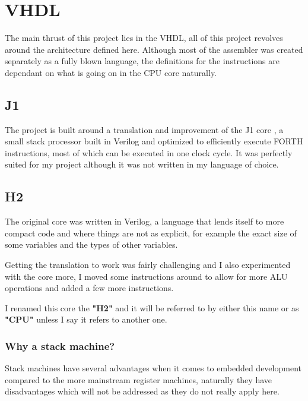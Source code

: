 \documentclass	[a4paper, 10pt]	{article}
\begin{document}
  
  \section{VHDL}

  The main thrust of this project lies in the VHDL, all of this project revolves around
  the architecture defined here. Although most of the assembler was created separately
  as a fully blown language, the definitions for the instructions are dependant on what 
  is going on in the CPU core naturally.

    \subsection{J1}
  
    The project is built around a translation and improvement of the J1 core \cite{j1core},
    a small stack processor built in Verilog and optimized to efficiently execute FORTH
    instructions, most of which can be executed in one clock cycle. It was perfectly suited
    for my project although it was not written in my language of choice.

    \subsection{H2}

    The original core was written in Verilog, a language that lends itself to more
    compact code and where things are not as explicit, for example the exact size of
    some variables and the types of other variables.

    Getting the translation to work was fairly challenging and I also experimented with
    the core more, I moved some instructions around to allow for more ALU operations
    and added a few more instructions.

    I renamed this core the \textbf{"H2"} and it will be referred to by either this name
    or as \textbf{"CPU"} unless I say it refers to another one.

    \subsubsection{Why a stack machine?}

    Stack machines have several advantages when it comes to embedded development compared
    to the more mainstream register machines, naturally they have disadvantages which 
    will not be addressed as they do not really apply here.
\end{document}
